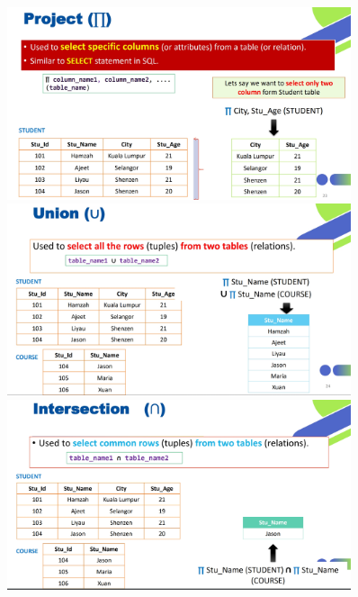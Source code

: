 \documentclass[a4paper, 12pt]{article}
\begin{document}
    \begin{figure}[H]
        \includegraphics[width=0.9\textwidth]{chapter1a_9.png}
        \includegraphics[width=0.9\textwidth]{chapter1a_10.png}
        \includegraphics[width=0.9\textwidth]{chapter1a_11.png}
    \end{figure}
\end{document}
